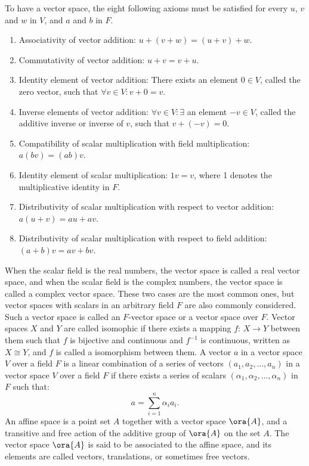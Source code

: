 \documentclass[a4paper,12pt]{report}
\begin{document}
To have a vector space, the eight following axioms must be satisfied for every $u$, $v$ and $w$ in $V$, and $a$ and $b$ in $F$.
\begin{enumerate}
\item Associativity of vector addition: $u + (v + w) = (u + v) + w$.
\item Commutativity of vector addition: $u + v = v + u$.
\item Identity element of vector addition: There exists an element $ 0 \in V$, called the zero vector, such that $\forall v\in V\colon v+ 0=v$.
\item Inverse elements of vector addition: $\forall v\in V\colon \exists$ an element $-v\in V$, called the additive inverse or inverse of $v$, such that $v + (−v) = 0$.
\item Compatibility of scalar multiplication with field multiplication: $a(bv) = (ab)v$.
\item Identity element of scalar multiplication: $1v = v$, where 1 denotes the multiplicative identity in $F$.
\item Distributivity of scalar multiplication with respect to vector addition: $a(u + v) = au + av$.
\item Distributivity of scalar multiplication with respect to field addition: $(a + b)v = av + bv$.
\end{enumerate}
When the scalar field is the real numbers, the vector space is called a real vector space, and when the scalar field is the complex numbers, the vector space is called a complex vector space. These two cases are the most common ones, but vector spaces with scalars in an arbitrary field $F$ are also commonly considered. Such a vector space is called an $F$-vector space or a vector space over $F$.
Vector spaces $X$ and $Y$ are called isomophic if there exists a mapping $f:\,X\to Y$ between them such that $f$ is bijective and continuous and $f^{-1}$ is continuous, written as \( X \cong Y \), and $f$ is called a isomorphism between them.
A vector $a$ in a vector space $V$ over a field $F$ is a linear combination of a series of vectors $(a_1,a_2,\ldots,a_n)$ in a vector space $V$ over a field $F$ if there exists a series of scalars $(\alpha_1,\alpha_2,\ldots,\alpha_n)$ in $F$ such that:
\[a=\sum_{i=1}^n\alpha_ia_i.\]
An affine space is a point set $A$ together with a vector space $\ora{A}$, and a transitive and free action of the additive group of $\ora{A}$ on the set $A$. The vector space $\ora{A}$ is said to be associated to the affine space, and its elements are called vectors, translations, or sometimes free vectors.
\end{document}
